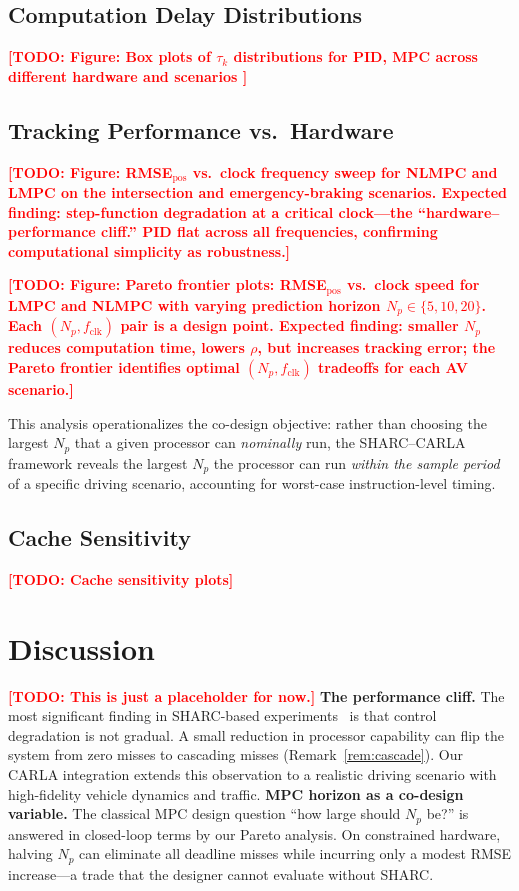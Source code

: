 \documentclass[conference]{IEEEtran}
\newcommand{\TODO}[1]{\textcolor{red}{\textbf{[TODO: #1]}}}
\begin{document}
\subsection{Computation Delay Distributions}

\TODO{Figure: Box plots of $\tau_k$ distributions for PID, MPC
across different hardware and scenarios }

\subsection{Tracking Performance vs.\ Hardware}
\TODO{Figure: RMSE$_\text{pos}$ vs.\ clock frequency sweep for
NLMPC and LMPC on the intersection and emergency-braking scenarios.
Expected finding: step-function degradation at a critical clock—the
``hardware--performance cliff.''  PID flat across all frequencies,
confirming computational simplicity as robustness.}

\TODO{Figure: Pareto frontier plots: RMSE$_\text{pos}$ vs.\ clock
speed for LMPC and NLMPC with varying prediction horizon $N_p \in
\{5, 10, 20\}$.  Each $(N_p, f_\text{clk})$ pair is a design point.
Expected finding: smaller $N_p$ reduces computation time, lowers
$\rho$, but increases tracking error; the Pareto frontier identifies
optimal $(N_p, f_\text{clk})$ tradeoffs for each AV scenario.}

This analysis operationalizes the co-design objective: rather than
choosing the largest $N_p$ that a given processor can \emph{nominally}
run, the SHARC--CARLA framework reveals the largest $N_p$ the processor
can run \emph{within the sample period} of a specific driving scenario,
accounting for worst-case instruction-level timing.



\subsection{Cache Sensitivity}
\TODO{Cache sensitivity plots}

\section{Discussion}\label{sec:discussion}

\TODO{This is just a placeholder for now.}
\noindent\textbf{The performance cliff.}
The most significant finding in SHARC-based
experiments~\cite{wintz2025sharc} is that control degradation is
not gradual.  A small reduction in processor capability can flip
the system from zero misses to cascading misses
(Remark~\ref{rem:cascade}).  Our CARLA integration extends this
observation to a realistic driving scenario with high-fidelity
vehicle dynamics and traffic.
\noindent\textbf{MPC horizon as a co-design variable.}
The classical MPC design question ``how large should $N_p$ be?'' is
answered in closed-loop terms by our Pareto analysis.  On constrained
hardware, halving $N_p$ can eliminate all deadline misses while
incurring only a modest RMSE increase—a trade that the designer cannot evaluate without SHARC.
\end{document}
